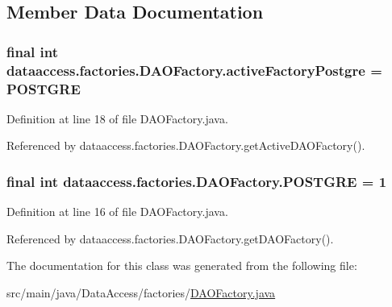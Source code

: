 \subsection{\-Member \-Data \-Documentation}
\hypertarget{classdataaccess_1_1factories_1_1_d_a_o_factory_a7d2a62ea6bfc7fcae70a8ea41311c921}{
\subsubsection[{active\-Factory\-Postgre}]{\setlength{\rightskip}{0pt plus 5cm}final int {\bf dataaccess.\-factories.\-D\-A\-O\-Factory.\-active\-Factory\-Postgre} = {\bf \-P\-O\-S\-T\-G\-R\-E}}}\label{classdataaccess_1_1factories_1_1_d_a_o_factory_a7d2a62ea6bfc7fcae70a8ea41311c921}


\-Definition at line 18 of file \-D\-A\-O\-Factory.\-java.



\-Referenced by dataaccess.\-factories.\-D\-A\-O\-Factory.\-get\-Active\-D\-A\-O\-Factory().

\hypertarget{classdataaccess_1_1factories_1_1_d_a_o_factory_acc94ae4fe422fa5d0dd7f33f6900e8c2}{
\subsubsection[{\-P\-O\-S\-T\-G\-R\-E}]{\setlength{\rightskip}{0pt plus 5cm}final int {\bf dataaccess.\-factories.\-D\-A\-O\-Factory.\-P\-O\-S\-T\-G\-R\-E} = 1}}\label{classdataaccess_1_1factories_1_1_d_a_o_factory_acc94ae4fe422fa5d0dd7f33f6900e8c2}


\-Definition at line 16 of file \-D\-A\-O\-Factory.\-java.



\-Referenced by dataaccess.\-factories.\-D\-A\-O\-Factory.\-get\-D\-A\-O\-Factory().



\-The documentation for this class was generated from the following file\-:\begin{DoxyCompactItemize}
\item 
src/main/java/\-Data\-Access/factories/\hyperlink{_d_a_o_factory_8java}{\-D\-A\-O\-Factory.\-java}\end{DoxyCompactItemize}
